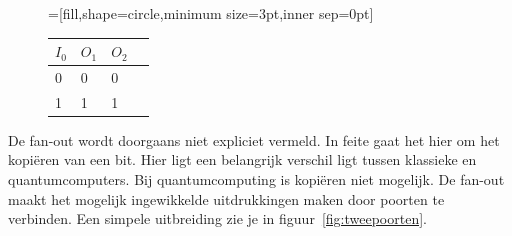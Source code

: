 \documentclass[../../main.tex]{subfiles}
\begin{document}
\begin{center}
\begin{figure}[h]
\begin{minipage}[b]{.22\textwidth}
{\begin{tabular}{|l|l|l|}
\end{tabular}
}
\end{minipage}
\begin{minipage}[b]{.22\textwidth}
\begin{center}
=[fill,shape=circle,minimum size=3pt,inner sep=0pt]
\end{center}
\end{minipage}%
\begin{minipage}[b]{.22\textwidth}
{\scriptsize
\begin{tabular}{|l|l|l|l|}
\hline
$I_0$ & $O_1$ & $O_2$ \\\hline
0  & 0& 0 \\\hline
1  & 1& 1 \\\hline
\end{tabular}
}
\end{minipage}
\end{figure}
\end{center}

De fan-out wordt doorgaans niet expliciet vermeld. In feite gaat het hier om het kopi\"eren van een bit. Hier ligt een belangrijk verschil ligt tussen klassieke en quantumcomputers. Bij quantumcomputing is kopi\"eren niet mogelijk. De fan-out maakt het mogelijk ingewikkelde uitdrukkingen maken door poorten te verbinden. Een simpele uitbreiding zie je in figuur~\ref{fig:tweepoorten}. 
\end{document}
